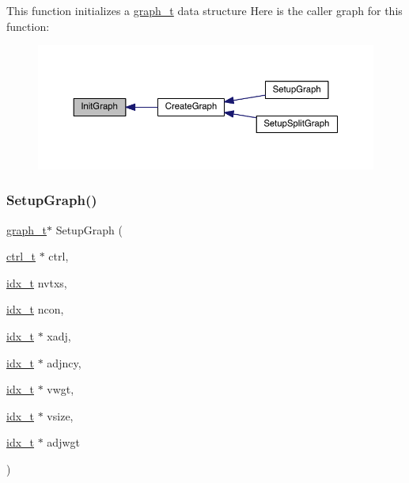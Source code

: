 This function initializes a \hyperlink{a00734}{graph\+\_\+t} data structure Here is the caller graph for this function\+:\nopagebreak
\begin{figure}[H]
\begin{center}
\leavevmode
\includegraphics[width=350pt]{a00849_af046766ada304a0cf49db44b544810a8_icgraph}
\end{center}
\end{figure}
\mbox{\label{a00849_a9192cba632de98d1759721a5676eaf05}} 
\subsubsection{\texorpdfstring{Setup\+Graph()}{SetupGraph()}}
{\footnotesize\ttfamily \hyperlink{a00734}{graph\+\_\+t}$\ast$ Setup\+Graph (\begin{DoxyParamCaption}\item[{\hyperlink{a00742}{ctrl\+\_\+t} $\ast$}]{ctrl,  }\item[{\hyperlink{a00876_aaa5262be3e700770163401acb0150f52}{idx\+\_\+t}}]{nvtxs,  }\item[{\hyperlink{a00876_aaa5262be3e700770163401acb0150f52}{idx\+\_\+t}}]{ncon,  }\item[{\hyperlink{a00876_aaa5262be3e700770163401acb0150f52}{idx\+\_\+t} $\ast$}]{xadj,  }\item[{\hyperlink{a00876_aaa5262be3e700770163401acb0150f52}{idx\+\_\+t} $\ast$}]{adjncy,  }\item[{\hyperlink{a00876_aaa5262be3e700770163401acb0150f52}{idx\+\_\+t} $\ast$}]{vwgt,  }\item[{\hyperlink{a00876_aaa5262be3e700770163401acb0150f52}{idx\+\_\+t} $\ast$}]{vsize,  }\item[{\hyperlink{a00876_aaa5262be3e700770163401acb0150f52}{idx\+\_\+t} $\ast$}]{adjwgt }\end{DoxyParamCaption})}

